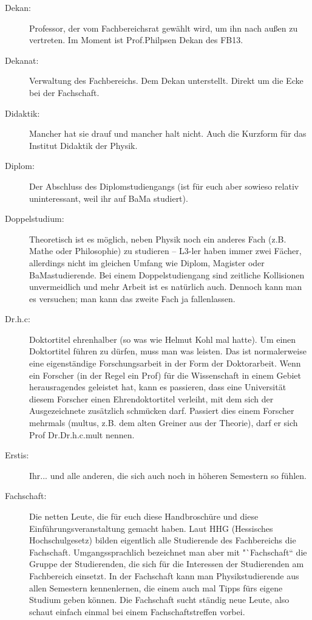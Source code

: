 \begin{description}
    \item[Dekan:] Professor, der vom Fachbereichsrat gewählt wird, um ihn nach außen zu vertreten.
      Im Moment ist Prof.Philpsen Dekan des FB13.

    \item[Dekanat:]Verwaltung des Fachbereichs.
      Dem Dekan unterstellt.
      Direkt um die Ecke bei der Fachschaft.

    \item[Didaktik:] Mancher hat sie drauf und mancher halt nicht.
      Auch die Kurzform für das Institut Didaktik der Physik.

    \item[Diplom:] Der Abschluss des Diplomstudiengangs (ist für euch aber sowieso relativ
uninteressant, weil ihr auf BaMa studiert).

    \item[Doppelstudium:]Theoretisch ist es möglich, neben Physik noch ein anderes Fach
(z.B. Mathe oder Philosophie) zu studieren -- L3-ler haben immer
zwei Fächer, allerdings nicht im gleichen Umfang wie Diplom,
Magister oder BaMastudierende. Bei einem Doppelstudiengang sind zeitliche
Kollisionen unvermeidlich und mehr Arbeit ist es natürlich auch.
Dennoch kann man es versuchen; man kann das zweite Fach ja
fallenlassen.

    \item[Dr.h.c:] Doktortitel ehrenhalber (so was wie Helmut
Kohl mal hatte). Um einen Doktortitel führen zu dürfen, muss man
was leisten. Das ist normalerweise eine eigenständige
Forschungsarbeit in der Form der Doktorarbeit. Wenn ein Forscher
(in der Regel ein Prof) für die Wissenschaft in einem Gebiet
herausragendes geleistet hat, kann es passieren, dass eine
Universität diesem Forscher einen Ehrendoktortitel verleiht, mit
dem sich der Ausgezeichnete zusätzlich schmücken darf. Passiert
dies einem Forscher mehrmals (multus, z.B. dem alten Greiner aus der Theorie), darf er sich Prof
Dr.Dr.h.c.mult nennen.

\item[Erstis:] Ihr... und alle anderen, die sich auch noch in höheren Semestern so fühlen.

    \item[Fachschaft:]Die netten Leute, die für
euch diese Handbroschüre und diese Einführungsveranstaltung gemacht
haben. Laut HHG (Hessisches Hochschulgesetz) bilden eigentlich
alle Studierende des Fachbereichs die Fachschaft. Umgangssprachlich
bezeichnet man aber mit "`Fachschaft`` die Gruppe der Studierenden, die
sich für die Interessen der Studierenden am Fachbereich einsetzt. In der
Fachschaft kann man Physikstudierende aus allen Semestern
kennenlernen, die einem auch mal Tipps fürs eigene Studium geben
können. Die Fachschaft sucht ständig neue Leute, also schaut
einfach einmal bei einem Fachschaftstreffen vorbei.


\end{description}
